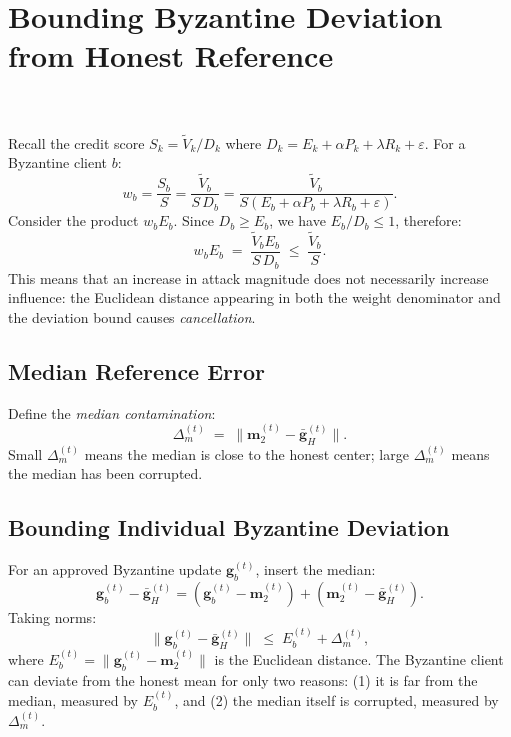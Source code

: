 \documentclass[../main]{subfiles}
\begin{document}
\section{Bounding Byzantine Deviation from Honest Reference}
\label{app:byz_bound}

\begin{lemma}
\hfill \\\label{lem:distance_cancellation}
\hfill \\
Recall the \aegis{} credit score $S_k = \widetilde{V}_k / D_k$ where
$D_k = E_k + \alpha P_k + \lambda R_k + \varepsilon$.
For a Byzantine client $b$:
\[
    w_b = \frac{S_b}{S} = \frac{\widetilde{V}_b}{S\,D_b}
    = \frac{\widetilde{V}_b}{S(E_b + \alpha P_b + \lambda R_b + \varepsilon)}.
\]
Consider the product $w_b E_b$. Since $D_b \geq E_b$, we have
$E_b / D_b \leq 1$, therefore:
\begin{equation}
    w_b E_b \;=\; \frac{\widetilde{V}_b E_b}{S\,D_b} \;\leq\; \frac{\widetilde{V}_b}{S}.
    \label{eq:dist_cancel}
\end{equation}
This means that an increase in attack magnitude does not necessarily increase influence: the Euclidean distance appearing in both the weight denominator and the deviation bound causes \emph{cancellation}.
\end{lemma}

\subsection{Median Reference Error}

Define the \emph{median contamination}:
\begin{equation}
    \Delta_m^{(t)} \;=\; \|\mathbf{m}_2^{(t)} - \bar{\mathbf{g}}_H^{(t)}\|.
    \label{eq:median_contam}
\end{equation}
Small $\Delta_m^{(t)}$ means the median is close to the honest center;
large $\Delta_m^{(t)}$ means the median has been corrupted.

\subsection{Bounding Individual Byzantine Deviation}

For an approved Byzantine update $\mathbf{g}_b^{(t)}$, insert the median:
\[
    \mathbf{g}_b^{(t)} - \bar{\mathbf{g}}_H^{(t)} = (\mathbf{g}_b^{(t)} - \mathbf{m}_2^{(t)}) + (\mathbf{m}_2^{(t)} - \bar{\mathbf{g}}_H^{(t)}).
\]
Taking norms:
\begin{equation}
    \|\mathbf{g}_b^{(t)} - \bar{\mathbf{g}}_H^{(t)}\| \;\leq\; E_b^{(t)} + \Delta_m^{(t)},
    \label{eq:byz_deviation}
\end{equation}
where $E_b^{(t)} = \|\mathbf{g}_b^{(t)} - \mathbf{m}_2^{(t)}\|$ is the Euclidean distance.
The Byzantine client can deviate from the honest mean for only two reasons:
(1) it is far from the median, measured by $E_b^{(t)}$, and
(2) the median itself is corrupted, measured by $\Delta_m^{(t)}$.
\end{document}
